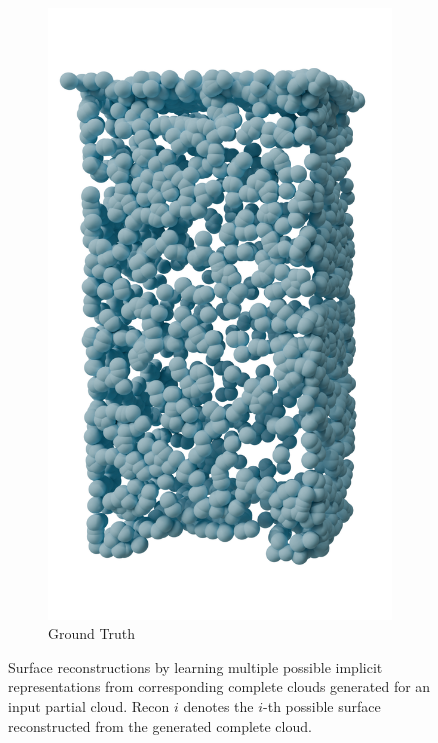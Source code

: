 \begin{figure}[htb]
\begin{subfigure}{0.19\textwidth}
            \includegraphics[width=\linewidth]{figures/inr_cabinet/comp_cabi.png}
            \caption{Ground Truth}
        \end{subfigure}
        \hfill
        \caption{Surface reconstructions by learning multiple possible implicit representations from corresponding complete clouds generated for an input partial cloud. Recon $i$ denotes the $i$-th possible surface reconstructed from the generated complete cloud.}
        \label{fig:pccinr}
    \end{figure}


